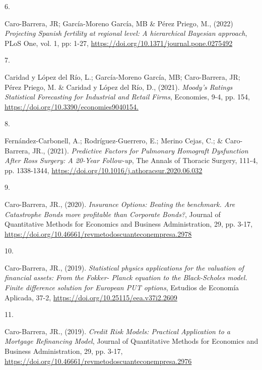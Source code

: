 \documentclass[10pt,a4paper,]{twentysecondcv}
\newlength{\csllabelwidth}
\newcommand{\CSLLeftMargin}[1]{\parbox[t]{\csllabelwidth}{#1}}
\newcommand{\CSLRightInline}[1]{\parbox[t]{\linewidth - \csllabelwidth}{#1}}
\begin{document}
\leavevmode{}%
\CSLLeftMargin{6. }
\CSLRightInline{Caro-Barrera, JR; Garc\'ia-Moreno Garc\'ia, MB \& P\'erez Priego, M., (2022) \emph{Projecting Spanish fertility at regional level: A hierarchical Bayesian approach}, PLoS One, vol. 1, pp: 1-27,
\url{https://doi.org/10.1371/journal.pone.0275492}}

\leavevmode{}%
\CSLLeftMargin{7. }
\CSLRightInline{Caridad y L\'opez del R\'io, L.; Garc\'ia-Moreno Garc\'ia, MB; Caro-Barrera, JR; P\'erez Priego, M. \& Caridad y L\'opez del R\'io, D., (2021). \emph{Moody's Ratings Statistical Forecasting for Industrial and Retail Firms}, Economies, 9-4, pp. 154, \url{https://doi.org/10.3390/economies9040154.}}

\CSLLeftMargin{8. }
\CSLRightInline{Fern\'andez-Carbonell, A.; Rodr\'iguez-Guerrero, E.; Merino Cejas, C.; \& Caro-Barrera, JR., (2021). \emph{Predictive Factors for
Pulmonary Homograft Dysfunction After Ross Surgery: A 20-Year Follow-up}, The Annals of Thoracic Surgery, 111-4, pp. 1338-1344, \url{https://doi.org/10.1016/j.athoracsur.2020.06.032}}

\CSLLeftMargin{9. }
\CSLRightInline{Caro-Barrera, JR., (2020). \emph{Insurance Options: Beating the benchmark. Are Catastrophe Bonds more profitable than Corporate Bonds?}, Journal of Quantitative Methods for Economics and Business Administration, 29, pp. 3-17, \url{https://doi.org/10.46661/revmetodoscuanteconempresa.2978}}

\CSLLeftMargin{10. }
\CSLRightInline{Caro-Barrera, JR., (2019). \emph{Statistical physics applications for the valuation of financial assets: From the Fokker- Planck equation to the Black-Scholes model. Finite difference solution for European PUT options}, Estudios de Econom\'ia Aplicada, 37-2, \url{https://doi.org/10.25115/eea.v37i2.2609}}

\CSLLeftMargin{11. }
\CSLRightInline{Caro-Barrera, JR., (2019). \emph{Credit Risk Models: Practical Application to a Mortgage Refinancing Model}, Journal of Quantitative Methods for Economics and Business Administration, 29, pp. 3-17, \url{https://doi.org/10.46661/revmetodoscuanteconempresa.2976}}

\end{document}
